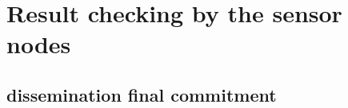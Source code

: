 \begin{exmp}
	\end{exmp}

\section{Result checking by the sensor nodes}

	\subsection{dissemination final commitment}
